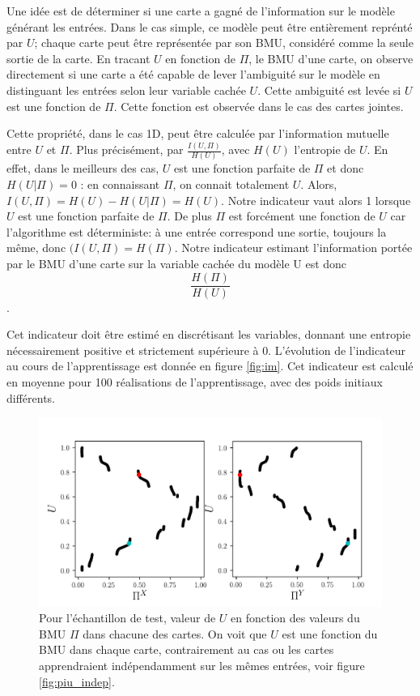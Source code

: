 Une idée est de déterminer si une carte a gagné de l'information sur le modèle générant les entrées. Dans le cas simple, ce modèle peut être entièrement reprénté par $U$; chaque carte peut être représentée par son BMU, considéré comme la seule sortie de la carte. 
En tracant $U$ en fonction de $\Pi$, le BMU d'une carte, on observe directement si une carte a été capable de lever l'ambiguité sur le modèle en distinguant les entrées selon leur variable cachée $U$. Cette ambiguité est levée si $U$ est une fonction de $\Pi$. Cette fonction est observée dans le cas des cartes jointes.

Cette propriété, dans le cas 1D, peut être calculée par l'information mutuelle entre $U$ et $\Pi$. Plus précisément, par $\frac{I(U,\Pi)}{H(U)}$, avec $H(U)$ l'entropie de $U$. 
En effet, dans le meilleurs des cas, $U$ est une fonction parfaite de $\Pi$ et donc $H(U|\Pi ) = 0$ : en connaissant $\Pi$, on connait totalement $U$. Alors, $I(U,\Pi) = H(U) - H(U| \Pi) = H(U)$. 
Notre indicateur vaut alors 1 lorsque $U$ est une fonction parfaite de $\Pi$.
De plus $\Pi$ est forcément une fonction de $U$ car l'algorithme est déterministe: à une entrée correspond une sortie, toujours la même, donc $(I(U, \Pi) = H(\Pi)$. Notre indicateur estimant l'information portée par le BMU d'une carte sur la variable cachée du modèle U est donc $$\frac{H(\Pi)}{H(U)}$$.

Cet indicateur doit être estimé en discrétisant les variables, donnant une entropie nécessairement positive et strictement supérieure à 0.
L'évolution de l'indicateur au cours de l'apprentissage est donnée en figure \ref{fig:im}. Cet indicateur est calculé en moyenne pour 100 réalisations de l'apprentissage, avec des poids initiaux différents. 

\begin{figure}
\centering
\includegraphics[width = \textwidth]{XU_YU.pdf}
\caption{Pour l'échantillon de test, valeur de $U$ en fonction des valeurs du BMU $\Pi$ dans chacune des cartes. On voit que $U$ est une fonction du BMU dans chaque carte, contrairement au cas ou les cartes apprendraient indépendamment sur les mêmes entrées, voir figure \ref{fig:piu_indep}.}
\label{fig:piu}
\end{figure}

